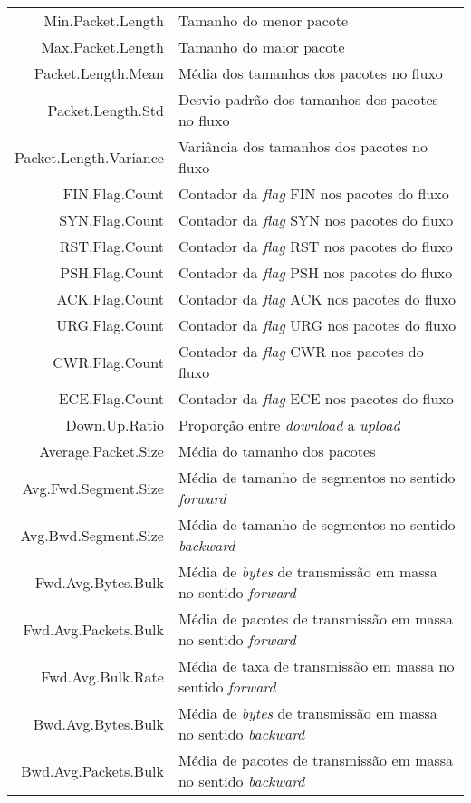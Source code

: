 \begin{longtable}{r|p{10.5cm}}
    Min.Packet.Length & Tamanho do menor pacote \\
    Max.Packet.Length & Tamanho do maior pacote \\
    Packet.Length.Mean & Média dos tamanhos dos pacotes no fluxo \\
    Packet.Length.Std & Desvio padrão dos tamanhos dos pacotes no fluxo \\
    Packet.Length.Variance & Variância dos tamanhos dos pacotes no fluxo \\
    FIN.Flag.Count & Contador da \textit{flag} FIN nos pacotes do fluxo \\
    SYN.Flag.Count & Contador da \textit{flag} SYN nos pacotes do fluxo \\
    RST.Flag.Count & Contador da \textit{flag} RST nos pacotes do fluxo \\
    PSH.Flag.Count & Contador da \textit{flag} PSH nos pacotes do fluxo \\
    ACK.Flag.Count & Contador da \textit{flag} ACK nos pacotes do fluxo \\
    URG.Flag.Count & Contador da \textit{flag} URG nos pacotes do fluxo \\
    CWR.Flag.Count & Contador da \textit{flag} CWR nos pacotes do fluxo \\
    ECE.Flag.Count & Contador da \textit{flag} ECE nos pacotes do fluxo \\
    Down.Up.Ratio & Proporção entre \textit{download} a \textit{upload} \\
    Average.Packet.Size & Média do tamanho dos pacotes \\
    Avg.Fwd.Segment.Size & Média de tamanho de segmentos no sentido \textit{forward} \\
    Avg.Bwd.Segment.Size & Média de tamanho de segmentos no sentido \textit{backward} \\
    Fwd.Avg.Bytes.Bulk & Média de \textit{bytes} de transmissão em massa no sentido \textit{forward} \\
    Fwd.Avg.Packets.Bulk & Média de pacotes de transmissão em massa no sentido \textit{forward} \\
    Fwd.Avg.Bulk.Rate & Média de taxa de transmissão em massa no sentido \textit{forward} \\
    Bwd.Avg.Bytes.Bulk & Média de \textit{bytes} de transmissão em massa no sentido \textit{backward} \\
    Bwd.Avg.Packets.Bulk & Média de pacotes de transmissão em massa no sentido \textit{backward} \\

\end{longtable}
